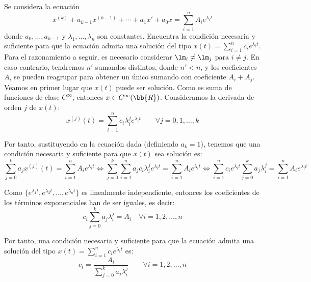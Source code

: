 \begin{ejercicio}\label{ej:4.12}
    Se considera la ecuación
    \[
        x^{(k)} + a_{k-1}x^{(k-1)} + \cdots + a_1x' + a_0x = \sum_{i = 1}^n A_i e^{\lambda_i t}
    \]
    donde $a_0, \ldots, a_{k-1}$ y $\lambda_1, \ldots, \lambda_n$ son constantes. Encuentra la condición necesaria y suficiente para que la ecuación admita una solución del tipo $x(t) = \sum\limits_{i = 1}^n c_i e^{\lambda_i t}$.\\

    Para el razonamiento a seguir, es necesario considerar $\lm_i\neq \lm_j$ para $i\neq j$. En caso contrario, tendremos $n'$ sumandos distintos, donde $n'<n$, y los coeficientes $A_i$ se pueden reagrupar para obtener un único sumando con coeficiente $A_i+A_j$.\\

    Veamos en primer lugar que $x(t)$ puede ser solución. Como es suma de funciones de clase $C^{\infty}$, entonces $x\in C^{\infty}(\bb{R})$. Consideramos la derivada de orden $j$ de $x(t)$:
    \begin{equation*}
        x^{(j)}(t)=\sum_{i=1}^n c_i\lambda_i^j e^{\lambda_i t}
        \qquad \forall j=0,1,\dots,k
    \end{equation*}

    Por tanto, sustituyendo en la ecuación dada (definiendo $a_k=1$), tenemos que una condición necesaria y suficiente para que $x(t)$ sea solución es:
    \begin{equation*}
        \sum_{j=0}^k a_{j}x^{(j)}(t)
        =\sum_{i = 1}^n A_i e^{\lambda_i t}
        \Longleftrightarrow
        \sum_{j=0}^k \sum_{i=1}^n a_{j}c_i\lambda_i^j e^{\lambda_i t}
        =\sum_{i = 1}^n A_i e^{\lambda_i t}
        \Longleftrightarrow
        \sum_{i=1}^n c_ie^{\lambda_i t}\sum_{j=0}^k a_{j}\lambda_i^j 
        =\sum_{i = 1}^n A_i e^{\lambda_i t}
    \end{equation*}

    Como $\{e^{\lambda_1 t},e^{\lambda_2 t},\dots,e^{\lambda_n t}\}$ es linealmente independiente, entonces los coeficientes de los términos exponenciales han de ser iguales, es decir:
    \begin{equation*}
        c_i\sum_{j=0}^k a_{j}\lambda_i^j = A_i \quad \forall i=1,2,\dots,n
    \end{equation*}

    Por tanto, una condición necesaria y suficiente para que la ecuación admita una solución del tipo $x(t) = \sum\limits_{i = 1}^n c_i e^{\lambda_i t}$ es:
    \begin{equation*}
        c_i=\dfrac{A_i}{\sum\limits_{j=0}^k a_{j}\lambda_i^j} \qquad \forall i=1,2,\dots,n
    \end{equation*}
\end{ejercicio}